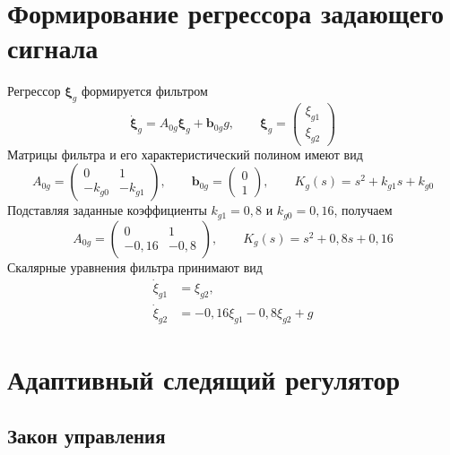 \section{Формирование регрессора задающего сигнала}

Регрессор $\bm\xi_g$ формируется фильтром
\begin{equation}
  \dot{\bm\xi}_g=A_{0g}\bm\xi_g+\bm b_{0g}g,
  \qquad
  \bm\xi_g=\begin{pmatrix}\xi_{g1}\\\xi_{g2}\end{pmatrix}
  \label{eq:reference-filter}
\end{equation}
Матрицы фильтра и его характеристический полином имеют вид
\begin{equation}
  A_{0g}=\begin{pmatrix}0&1\\-k_{g0}&-k_{g1}\end{pmatrix},
  \qquad \bm b_{0g}=\begin{pmatrix}0\\1\end{pmatrix},
  \qquad K_g(s)=s^2+k_{g1}s+k_{g0}
  \label{eq:filter-matrices}
\end{equation}
Подставляя заданные коэффициенты $k_{g1}=0{,}8$ и $k_{g0}=0{,}16$,
получаем
\begin{equation}
  A_{0g}=\begin{pmatrix}0&1\\-0{,}16&-0{,}8\end{pmatrix},
  \qquad K_g(s)=s^2+0{,}8s+0{,}16
  \label{eq:filter-matrices-numeric}
\end{equation}
Скалярные уравнения фильтра принимают вид
\begin{equation}
  \begin{aligned}
    \dot\xi_{g1}&=\xi_{g2},\\
    \dot\xi_{g2}&=-0{,}16\xi_{g1}-0{,}8\xi_{g2}+g
  \end{aligned}
  \label{eq:reference-filter-numeric}
\end{equation}

\section{Адаптивный следящий регулятор}

\subsection{Закон управления}

